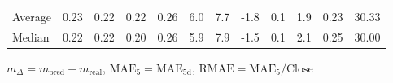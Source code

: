 \begin{threeparttable}
{\begin{tabular}{lrrrrrrrrrrr}
Average &          0.23 &          0.22 &          0.22 &        0.26 &                 6.0 &                 7.7 &       -1.8 &                 0.1 &              1.9 &            0.23 &                  30.33 \\
 Median &          0.22 &          0.22 &          0.20 &        0.26 &                 5.9 &                 7.9 &       -1.5 &                 0.1 &              2.1 &            0.25 &                  30.00 \\
\bottomrule
\end{tabular}
}
\begin{tablenotes}\footnotesize
\item $m_\Delta=m_{\text{pred}}-m_{\text{real}}$,
$\mathrm{MAE}_5=\mathrm{MAE}_{5\text{d}}$,
$\mathrm{RMAE}=\mathrm{MAE}_5/\text{Close}$
\end{tablenotes}
\end{threeparttable}
\endgroup

